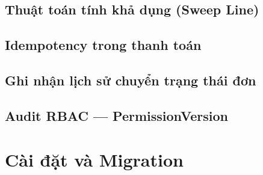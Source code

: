 \subsection{Thuật toán tính khả dụng (Sweep Line)}

\subsection{Idempotency trong thanh toán}

\subsection{Ghi nhận lịch sử chuyển trạng thái đơn}

\subsection{Audit RBAC --- PermissionVersion}

\section{Cài đặt và Migration}
\label{sec:cai_dat_db}

